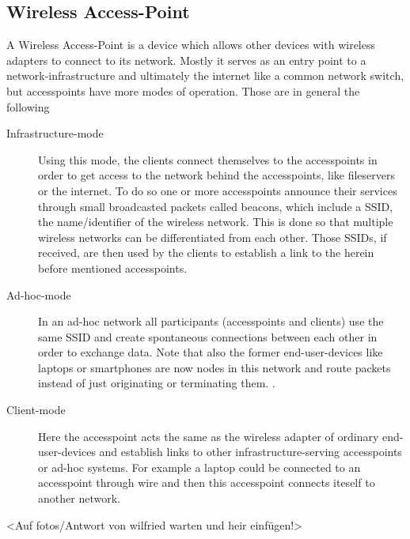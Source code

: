   \subsection{Wireless Access-Point}
    A Wireless Access-Point is a device which allows other devices with wireless adapters to connect to its network.
    Mostly it serves as an entry point to a network-infrastructure and ultimately the internet like a common network switch, 
    but accesspoints have more modes of operation. Those are in general the following
    \begin{description}
      \item[Infrastructure-mode]
	Using this mode, the clients connect themselves to the accesspoints in order to get access to the network behind the accesspoints, like fileservers or the internet.
	To do so one or more accesspoints announce their services through small broadcasted packets called beacons, which include a \ac{SSID}, 
	the name/identifier of the wireless network. This is done 
	so that multiple wireless networks can be differentiated from each other. Those SSIDs, if received, are then used by the clients to
	establish a link to the herein before mentioned accesspoints.
      \item [Ad-hoc-mode]
	In an ad-hoc network all participants (accesspoints and clients) use the same \ac{SSID} and create spontaneous connections between each other in order to 
	exchange data. Note that also the former end-user-devices like laptops or smartphones are now nodes in this network and route packets instead of just originating or
	terminating them. \cite{Akyildiz2005445}.
     \item [Client-mode]
	Here the accesspoint acts the same as the wireless adapter of ordinary end-user-devices and establish links to other infrastructure-serving accesspoints or 
	ad-hoc systems. For example a laptop could be connected to an accesspoint through wire and then this accesspoint connects iteself to another network.
    \end{description}
    
    <Auf fotos/Antwort von wilfried warten und heir einfügen!>
    
